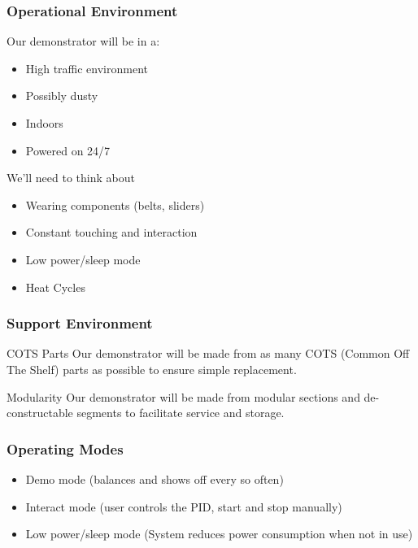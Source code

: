 \documentclass[aspectratio=169]{beamer}
\begin{document}
\begin{frame}
    \frametitle{Operational Environment}

    Our demonstrator will be in a:
    \begin{itemize}
        \item High traffic environment
        \item Possibly dusty
        \item Indoors
        \item Powered on 24/7
    \end{itemize}

    We'll need to think about

    \begin{itemize}
        \item Wearing components (belts, sliders)
        \item Constant touching and interaction
        \item Low power/sleep mode
        \item Heat Cycles
    \end{itemize}

\end{frame}


\begin{frame}
    \frametitle{Support Environment}

    \begin{block}{COTS Parts}
        Our demonstrator will be made from as many COTS (Common Off The Shelf) parts
        as possible to ensure simple replacement.
    \end{block}

    \begin{block}{Modularity}
        Our demonstrator will be made from modular sections and de-constructable segments
        to facilitate service and storage.
    \end{block}

\end{frame}


\begin{frame}
    \frametitle{Operating Modes}

    \begin{itemize}
        \item Demo mode (balances and shows off every so often)
        \item Interact mode (user controls the PID, start and stop manually)
        \item Low power/sleep mode (System reduces power consumption when not in use)
    \end{itemize}

\end{frame}
\end{document}

